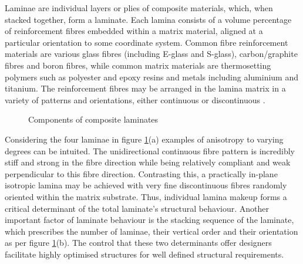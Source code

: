 Laminae are individual layers or plies of composite materials, which, when stacked together, form a laminate. Each lamina consists of a volume percentage of reinforcement fibres embedded within a matrix material, aligned at a particular orientation to some coordinate system. Common fibre reinforcement materials are various glass fibres (including E-glass and S-glass), carbon/graphite fibres and boron fibres, while common matrix materials are thermosetting polymers such as polyester and epoxy resins and metals including aluminium and titanium. The reinforcement fibres may be arranged in the lamina matrix in a variety of patterns and orientations, either continuous or discontinuous \cite{agarwal2006analysis}. 
\begin{figure}[H]
	\caption{\label{composite_laminates}Components of composite laminates \cite{reddy2004mechanics}}
\end{figure}

Considering the four laminae in figure \ref{composite_laminates}(a) examples of anisotropy to varying degrees can be intuited. The unidirectional continuous fibre pattern is incredibly stiff and strong in the fibre direction while being relatively compliant and weak  perpendicular to this fibre direction. Contrasting this, a practically in-plane isotropic lamina may be achieved with very fine discontinuous fibres randomly oriented within the matrix substrate. Thus, individual lamina makeup forms a critical determinant of the total laminate's structural behaviour. Another important factor of laminate behaviour is the stacking sequence of the laminate, which prescribes the number of laminae, their vertical order and their orientation as per figure \ref{composite_laminates}(b). The control that these two determinants offer designers facilitate highly optimised structures for well defined structural requirements.

